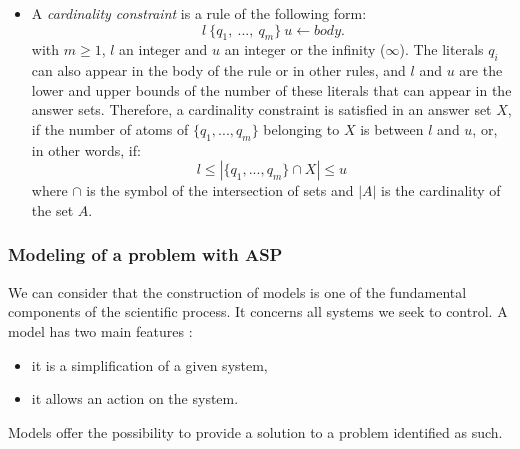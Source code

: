 \begin{enumerate}
\begin{itemize}
\item A \emph{cardinality constraint} is a rule of the following form:
\begin{equation} 
 ~ l ~\{q_{1},~ ... ,~ q_{m}\}~ u \leftarrow body.
 \label{eq7ASP}
\end{equation}
with $m \geq 1$, $l$ an integer and $u$ an integer or the infinity ($\infty$).
The literals $q_i$ can also appear in the body of the rule or in other rules,
and $l$ and $u$ are the lower and upper bounds of the number of these literals
that can appear in the answer sets.
Therefore, a cardinality constraint is satisfied in an answer set $X$, if the number of atoms of $\{q_{1}, ... , q_{m}\}$ belonging to $X$ is between $l$ and $u$,
or, in other words, if:
\begin{equation}
  l \leq | \{q_{1},... , q_{m}\} \cap X | \leq u
\end{equation}
where $\cap$ is the symbol of the intersection of sets
and $|A|$ is the cardinality of the set $A$.
%
\end{itemize}

\end{enumerate}



\subsubsection{Modeling of a problem with ASP}

We can consider that the construction of models is one of the fundamental components of the scientific process. It concerns all systems we seek to control. A model has two main features \cite{Glimpse}:
\begin{itemize}
\item it is a simplification of a given system,
\item it allows an action on the system.
\end{itemize}
Models offer the possibility to provide a solution to a problem identified as such.


